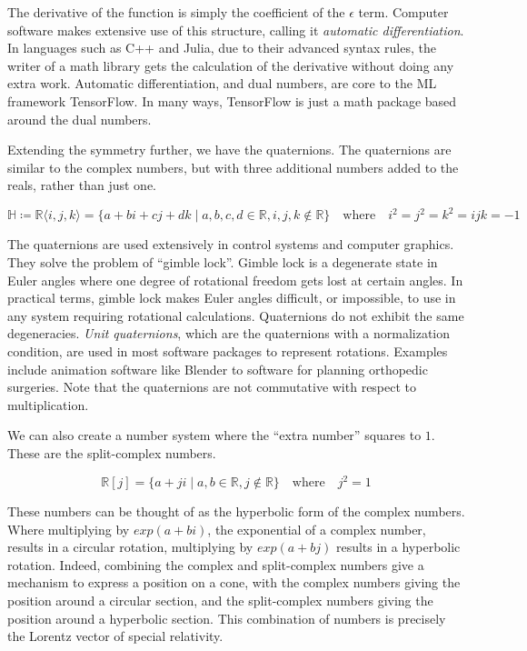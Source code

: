 \documentclass[8pt]{article}
\begin{document}
The derivative of the function is simply the coefficient of the $\epsilon$ term. Computer software makes extensive use of this structure, calling it \emph{automatic differentiation}. In languages such as C++ and Julia, due to their advanced syntax rules, the writer of a math library gets the calculation of the derivative without doing any extra work. Automatic differentiation, and dual numbers, are core to the ML framework TensorFlow. In many ways, TensorFlow is just a math package based around the dual numbers.

Extending the symmetry further, we have the quaternions. The quaternions are similar to the complex numbers, but with three additional numbers added to the reals, rather than just one.

\[
  \mathbb{H} \coloneqq \mathbb{R}\langle i,j,k \rangle = \{a + bi + cj + dk \mid a, b, c, d \in \mathbb{R}, i,j,k \notin \mathbb{R} \} \quad \text{where} \quad i^2 = j^2 = k^2 = ijk = -1
\]

The quaternions are used extensively in control systems and computer graphics. They solve the problem of ``gimble lock''. Gimble lock is a degenerate state in Euler angles where one degree of rotational freedom gets lost at certain angles. In practical terms, gimble lock makes Euler angles difficult, or impossible, to use in any system requiring rotational calculations. Quaternions do not exhibit the same degeneracies. \emph{Unit quaternions}, which are the quaternions with a normalization condition, are used in most software packages to represent rotations. Examples include animation software like Blender to software for planning orthopedic surgeries. Note that the quaternions are not commutative with respect to multiplication.

We can also create a number system where the ``extra number'' squares to $1$. These are the split-complex numbers.

\[
  \mathbb{R}[j] = \{a + ji \mid a, b \in \mathbb{R}, j \notin \mathbb{R} \} \quad \text{where} \quad j^2 = 1
\]

These numbers can be thought of as the hyperbolic form of the complex numbers. Where multiplying by $exp(a + bi)$, the exponential of a complex number, results in a circular rotation, multiplying by $exp(a + bj)$ results in a hyperbolic rotation. Indeed, combining the complex and split-complex numbers give a mechanism to express a position on a cone, with the complex numbers giving the position around a circular section, and the split-complex numbers giving the position around a hyperbolic section. This combination of numbers is precisely the Lorentz vector of special relativity.
\end{document}
